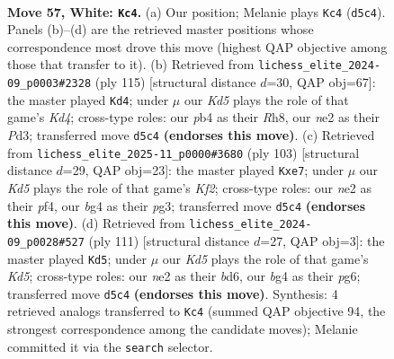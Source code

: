 \documentclass[11pt]{article}
\begin{document}
\clearpage

\begin{figure}[p]\centering
\begin{subfigure}{0.46\textwidth}\centering
\resizebox{\linewidth}{!}{%
\newchessgame
\chessboard[
  setfen={8/7p/5k2/r2Kp3/1p4b1/8/4n1r1/8 w - - 4 57},
  showmover=false,
  pgfstyle=straightmove, color=movearrow, markmove={d5-c4}
]}
\caption{}
\end{subfigure}\hfill
\begin{subfigure}{0.46\textwidth}\centering
\resizebox{\linewidth}{!}{%
\newchessgame
\chessboard[
  setfen={7r/8/8/3k2R1/8/1P1p3P/5PK1/8 b - - 3 58},
  showmover=false,
  pgfstyle=straightmove, color=movearrow, markmove={d5-d4}
]}
\caption{}
\end{subfigure}
\\[4pt]
\begin{subfigure}{0.46\textwidth}\centering
\resizebox{\linewidth}{!}{%
\newchessgame
\chessboard[
  setfen={8/4Rk2/8/8/5P2/2R3P1/Pr6/6K1 b - - 0 52},
  showmover=false,
  pgfstyle=straightmove, color=movearrow, markmove={f7-e7}
]}
\caption{}
\end{subfigure}\hfill
\begin{subfigure}{0.46\textwidth}\centering
\resizebox{\linewidth}{!}{%
\newchessgame
\chessboard[
  setfen={8/1K6/3B1RP1/2P4p/3k3P/8/8/2r5 b - - 0 56},
  showmover=false,
  pgfstyle=straightmove, color=movearrow, markmove={d4-d5}
]}
\caption{}
\end{subfigure}
\caption{\textbf{Move 57, White: \texttt{Kc4}.} (a) Our position; Melanie plays \texttt{Kc4} (\texttt{d5c4}). Panels (b)--(d) are the retrieved master positions whose correspondence most drove this move (highest QAP objective among those that transfer to it). (b) Retrieved from \texttt{lichess\_elite\_2024-09\_p0003\#2328} (ply 115) [structural distance $d$=30, QAP obj=67]: the master played \texttt{Kd4}; under $\mu$ our \emph{Kd5} plays the role of that game's \emph{Kd4}; cross-type roles: our \emph{p}b4 as their \emph{R}h8, our \emph{n}e2 as their \emph{P}d3; transferred move \texttt{d5c4} \textbf{(endorses this move)}. (c) Retrieved from \texttt{lichess\_elite\_2025-11\_p0000\#3680} (ply 103) [structural distance $d$=29, QAP obj=23]: the master played \texttt{Kxe7}; under $\mu$ our \emph{Kd5} plays the role of that game's \emph{Kf2}; cross-type roles: our \emph{n}e2 as their \emph{p}f4, our \emph{b}g4 as their \emph{p}g3; transferred move \texttt{d5c4} \textbf{(endorses this move)}. (d) Retrieved from \texttt{lichess\_elite\_2024-09\_p0028\#527} (ply 111) [structural distance $d$=27, QAP obj=3]: the master played \texttt{Kd5}; under $\mu$ our \emph{Kd5} plays the role of that game's \emph{Kd5}; cross-type roles: our \emph{n}e2 as their \emph{b}d6, our \emph{b}g4 as their \emph{p}g6; transferred move \texttt{d5c4} \textbf{(endorses this move)}. Synthesis: 4 retrieved analogs transferred to \texttt{Kc4} (summed QAP objective 94, the strongest correspondence among the candidate moves); Melanie committed it via the \texttt{search} selector.}
\label{fig:thought-m112}
\end{figure}
\end{document}
